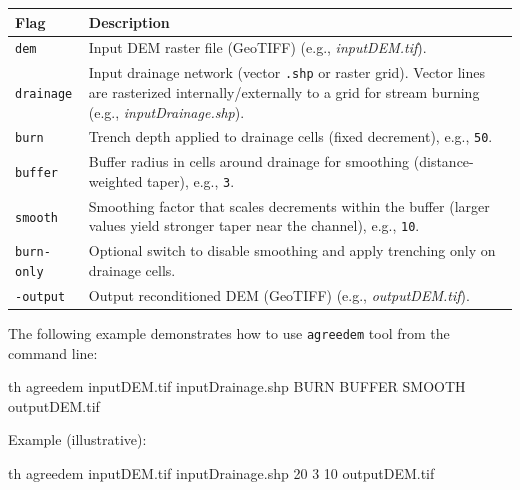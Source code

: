 \documentclass[
]{book}
\newenvironment{Shaded}{\begin{snugshade}}{\end{snugshade}}
\newcommand{\ExtensionTok}[1]{#1}
\newcommand{\NormalTok}[1]{#1}
\begin{document}
\begin{longtable}[]{@{}
  >{\raggedright\arraybackslash}p{}
  >{\raggedright\arraybackslash}p{}@{}}
\toprule\noalign{}
\begin{minipage}[b]{\linewidth}\raggedright
Flag
\end{minipage} & \begin{minipage}[b]{\linewidth}\raggedright
Description
\end{minipage} \\
\midrule\noalign{}
\endhead
\bottomrule\noalign{}
\endlastfoot
\texttt{dem} & Input DEM raster file (GeoTIFF) (e.g., \emph{inputDEM.tif}). \\
\texttt{drainage} & Input drainage network (vector \texttt{.shp} or raster grid). Vector lines are rasterized internally/externally to a grid for stream burning (e.g., \emph{inputDrainage.shp}). \\
\texttt{burn} & Trench depth applied to drainage cells (fixed decrement), e.g., \texttt{50}. \\
\texttt{buffer} & Buffer radius in cells around drainage for smoothing (distance-weighted taper), e.g., \texttt{3}. \\
\texttt{smooth} & Smoothing factor that scales decrements within the buffer (larger values yield stronger taper near the channel), e.g., \texttt{10}. \\
\texttt{burn-only} & Optional switch to disable smoothing and apply trenching only on drainage cells. \\
\texttt{-output} & Output reconditioned DEM (GeoTIFF) (e.g., \emph{outputDEM.tif}). \\
\end{longtable}

The following example demonstrates how to use \texttt{agreedem} tool from the command line:

\begin{Shaded}
\begin{Highlighting}[]
\ExtensionTok{th}\NormalTok{ agreedem inputDEM.tif inputDrainage.shp BURN BUFFER SMOOTH outputDEM.tif}
\end{Highlighting}
\end{Shaded}

Example (illustrative):

\begin{Shaded}
\begin{Highlighting}[]
\ExtensionTok{th}\NormalTok{ agreedem inputDEM.tif inputDrainage.shp 20 3 10 outputDEM.tif}
\end{Highlighting}
\end{Shaded}
\end{document}
